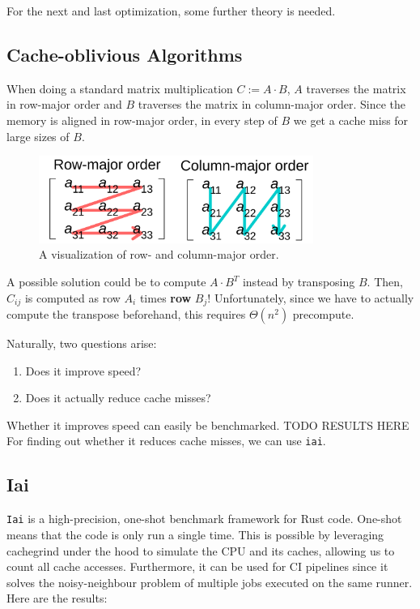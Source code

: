 For the next and last optimization, some further theory is needed.
\subsection{Cache-oblivious Algorithms}

When doing a standard matrix multiplication $C:=A \cdot B$, $A$ traverses the matrix in row-major order and $B$ traverses the matrix in column-major order. Since the memory is aligned in row-major order, in every step of $B$ we get a cache miss for large sizes of $B$.

\begin{figure}[H]
  \centering
  \includegraphics[width=0.8\textwidth]{./assets/rowcol}
  \caption{A visualization of row- and column-major order.}
\end{figure}

A possible solution could be to compute $A \cdot B^T$ instead by transposing $B$. Then, $C_{ij}$ is computed as row $A_i$ times \textbf{row} $B_j$! Unfortunately, since we have to actually compute the transpose beforehand, this requires $\Theta(n^2)$ precompute.

Naturally, two questions arise:
\begin{enumerate}
  \item Does it improve speed?
  \item Does it actually reduce cache misses?
\end{enumerate}

Whether it improves speed can easily be benchmarked.
TODO RESULTS HERE\\

For finding out whether it reduces cache misses, we can use \texttt{iai}.

\subsection{Iai}
\texttt{Iai} \cite{iai} is a high-precision, one-shot benchmark framework for Rust code. One-shot means that the code is only run a single time. This is possible by leveraging cachegrind \cite{cachegrind} under the hood to simulate the CPU and its caches, allowing us to count all cache accesses. Furthermore, it can be used for \ac{CI} pipelines since it solves the noisy-neighbour problem of multiple jobs executed on the same runner. Here are the results:

